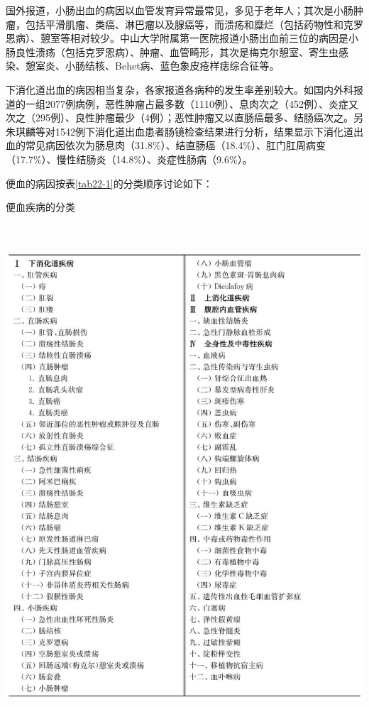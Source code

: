 国外报道，小肠出血的病因以血管发育异常最常见，多见于老年人；其次是小肠肿瘤，包括平滑肌瘤、类癌、淋巴瘤以及腺癌等，而溃疡和糜烂（包括药物性和克罗恩病）、憩室等相对较少。中山大学附属第一医院报道小肠出血前三位的病因是小肠良性溃疡（包括克罗恩病）、肿瘤、血管畸形，其次是梅克尔憩室、寄生虫感染、憩室炎、小肠结核、Behet病、蓝色象皮疮样痣综合征等。

下消化道出血的病因相当复杂，各家报道各病种的发生率差别较大。如国内外科报道的一组2077例病例，恶性肿瘤占最多数（1110例）、息肉次之（452例）、炎症又次之（295例）、良性肿瘤最少（4例）；恶性肿瘤又以直肠癌最多、结肠癌次之。另朱琪麟等对1542例下消化道出血患者肠镜检查结果进行分析，结果显示下消化道出血的常见病因依次为肠息肉（31.8\%）、结直肠癌（18.4\%）、肛门肛周病变（17.7\%）、慢性结肠炎（14.8\%）、炎症性肠病（9.6\%）。

便血的病因按表\ref{tab22-1}的分类顺序讨论如下：

\begin{table}[htbp]
\centering
\caption{便血疾病的分类}
\label{tab22-1}
\includegraphics[width=5.91667in,height=7.41667in]{./images/Image00123.jpg}
\end{table}

